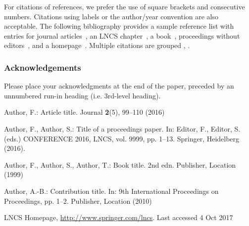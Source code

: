 \documentclass[runningheads]{llncs}
\begin{document}
%
%

For citations of references, we prefer the use of square brackets
and consecutive numbers. Citations using labels or the author/year
convention are also acceptable. The following bibliography provides
a sample reference list with entries for journal
articles~\cite{ref_article1}, an LNCS chapter~\cite{ref_lncs1}, a
book~\cite{ref_book1}, proceedings without editors~\cite{ref_proc1},
and a homepage~\cite{ref_url1}. Multiple citations are grouped
\cite{ref_article1,ref_lncs1,ref_book1},
\cite{ref_article1,ref_book1,ref_proc1,ref_url1}.

\subsubsection{Acknowledgements} Please place your acknowledgments at
the end of the paper, preceded by an unnumbered run-in heading (i.e.
3rd-level heading).

%
%
%
% 
% 
%
\begin{thebibliography}{8}
Author, F.: Article title. Journal \textbf{2}(5), 99--110 (2016)

Author, F., Author, S.: Title of a proceedings paper. In: Editor,
F., Editor, S. (eds.) CONFERENCE 2016, LNCS, vol. 9999, pp. 1--13.
Springer, Heidelberg (2016). 

Author, F., Author, S., Author, T.: Book title. 2nd edn. Publisher,
Location (1999)

Author, A.-B.: Contribution title. In: 9th International Proceedings
on Proceedings, pp. 1--2. Publisher, Location (2010)

LNCS Homepage, \url{http://www.springer.com/lncs}. Last accessed 4
Oct 2017
\end{thebibliography}
\end{document}
